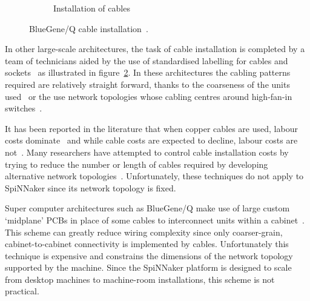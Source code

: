 \begin{figure}
\begin{subfigure}[t]{0.30\textwidth}
					\caption{Installation of cables}
					\label{fig:bgWiringInstallation}
				\end{subfigure}
				
				\caption{BlueGene/Q cable installation~\cite{cscs13}.}
				\label{fig:bgWiring}
			\end{figure}
			
			In other large-scale architectures, the task of cable installation is
			completed by a team of technicians aided by the use of standardised
			labelling for cables and sockets~\cite{tia2006} as illustrated in
			figure~\ref{fig:bgWiring}. In these architectures the cabling patterns
			required are relatively straight forward, thanks to the coarseness of the
			units used~\cite{lakner07} or the use network topologies whose cabling
			centres around high-fan-in switches~\cite{cisco07,csernai15}.
			
			It has been reported in the literature that when copper cables are used,
			labour costs dominate~\cite{popa10} and while cable costs are expected to
			decline, labour costs are not~\cite{mudigonda11}. Many researchers have
			attempted to control cable installation costs by trying to reduce the
			number or length of cables required by developing alternative network
			topologies~\cite{curtis12, popa10, mudigonda11}.  Unfortunately, these
			techniques do not apply to SpiNNaker since its network topology is fixed.
			
			Super computer architectures such as BlueGene/Q make use of large custom
			`midplane' PCBs in place of some cables to interconnect units within a
			cabinet~\cite{milano13}. This scheme can greatly reduce wiring complexity
			since only coarser-grain, cabinet-to-cabinet connectivity is implemented
			by cables. Unfortunately this technique is expensive and constrains the
			dimensions of the network topology supported by the machine. Since the
			SpiNNaker platform is designed to scale from desktop machines to
			machine-room installations, this scheme is not practical.
			
